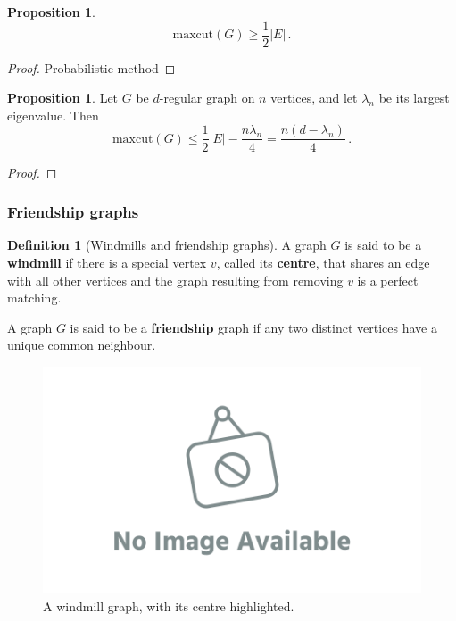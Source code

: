 \documentclass[12pt]{amsart}
\theoremstyle{definition}
\newtheorem{prop}[thm]{Proposition}
\newtheorem{defin}[thm]{Definition}
\newcommand{\maxcut}{\mathrm{maxcut}}
\begin{document}
\begin{prop}
$$\maxcut(G) \geq \frac{1}{2}|E| \, .$$
\end{prop}

\begin{proof}
Probabilistic method
\end{proof}


\begin{prop}
Let $G$ be $d$-regular graph on $n$ vertices, and let $\lambda_n$ be its largest eigenvalue.
Then 
$$\maxcut(G) \leq \frac{1}{2} |E| - \frac{n \lambda_n}{4} = \frac{n (d-\lambda_n)}{4} \, . $$
\end{prop}

\begin{proof}

\end{proof}



\subsubsection*{Friendship graphs}

\begin{defin}[Windmills and friendship graphs]
A graph $G$ is said to be a \textbf{windmill} if there is a special vertex $v$, called its \textbf{centre}, that shares an edge with all other vertices and the graph resulting from removing $v$ is a perfect matching.

A graph $G$ is said to be a \textbf{friendship} graph if any two distinct vertices have a unique common neighbour.
\end{defin}


\begin{figure}[h]
\includegraphics[scale=.1]{../imgs/ina.png}%
\caption{A windmill graph, with its centre highlighted.\label{fig:windmill}}
\end{figure}
\end{document}
